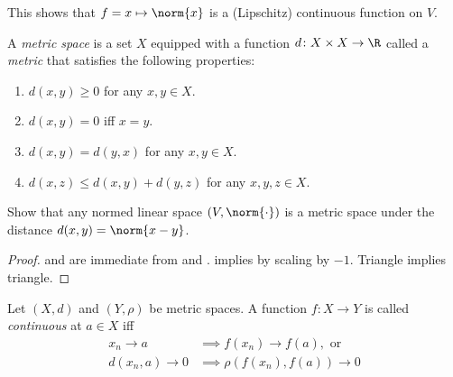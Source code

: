 This shows that $f = x \mapsto \norm{x}$ is a (Lipschitz) continuous
function on $V$.

\begin{definition} \label{def:metric}
    A \emph{metric space} is a set $X$ equipped with a function
    $d\colon X \times X \to \R$ called a \emph{metric} that satisfies
    the following properties:
    \begin{enumerate}[label=\small(M\arabic*)]
        \item $d(x, y) \ge 0$ for any $x, y \in X$.
            \label{def:metric:pos}
        \item $d(x, y) = 0$ iff $x = y$.
            \label{def:metric:def}
        \item $d(x, y) = d(y, x)$ for any $x, y \in X$.
            \label{def:metric:sym}
        \item $d(x, z) \le d(x, y) + d(y, z)$ for any $x, y, z \in X$.
            \label{def:metric:tri}
    \end{enumerate}
\end{definition}

\begin{exercise}[self]
    Show that any normed linear space $(V, \norm{\cdot})$ is a metric space
    under the distance $d(x, y) = \norm{x - y}$.
\end{exercise}
\begin{proof}
     and  are immediate
    from  and .
     implies  by
    scaling by $-1$.
    Triangle implies triangle.
\end{proof}

\begin{definition}[continuity] \label{def:cont}
    Let $(X, d)$ and $(Y, \rho)$ be metric spaces.
    A function $f\colon X \to Y$ is called \emph{continuous} at $a \in X$
    iff \begin{align*}
        x_n \to a &\implies f(x_n) \to f(a), \text{ or} \\
        d(x_n, a) \to 0 &\implies \rho(f(x_n), f(a)) \to 0
    \end{align*}
\end{definition}

